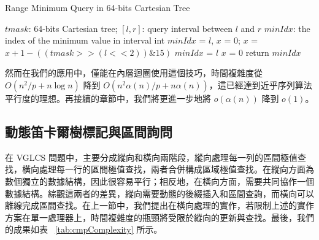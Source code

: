 \documentclass{gapd}
\begin{document}
\begin{algorithm*}
  \caption{Range Minimum Query in 64-bits Cartesian Tree}
  \label{alg:cacheObliviousQuery}
  \begin{algorithmic}[1]
    \Require
      $\textit{tmask}$: 64-bits Cartesian tree;
      $[l, r]$: query interval between $l$ and $r$
    \Ensure 
      $\textit{minIdx}$: the index of the minimum value in interval
    \State int $\textit{minIdx}$ = $l$, $x$ = $0$;
      \State $x$ = $x+1 - ((tmask>>(l<<2))\&15)$
        \State $\textit{minIdx}$ = $l$
        \State $x$ = $0$
      \EndIf
    \EndFor
    \State return $\textit{minIdx}$
  \end{algorithmic}
\end{algorithm*}

然而在我們的應用中，僅能在內層迴圈使用這個技巧，時間複雜度從 $O(n^2 / p + n \log n)$ 降到 $O(n^2 \alpha(n) / p + n \alpha(n))$，這已經達到近乎序列算法平行度的理想。再接續的章節中，我們將更進一步地將 $o(\alpha(n))$ 降到 $o(1)$。

\subsection{動態笛卡爾樹標記與區間詢問}

在 VGLCS 問題中，主要分成縱向和橫向兩階段，縱向處理每一列的區間極值查找，橫向處理每一行的區間極值查找，兩者合併構成區域極值查找。在縱向方面為數個獨立的數據結構，因此很容易平行；相反地，在橫向方面，需要共同協作一個數據結構。綜觀這兩者的差異，縱向需要動態的後綴插入和區間查詢，而橫向可以離線完成區間查找。在上一節中，我們提出在橫向處理的實作，若限制上述的實作方案在單一處理器上，時間複雜度的瓶頸將受限於縱向的更新與查找。最後，我們的成果如表 ~\ref{tab:cmpComplexity} 所示。
\end{document}
